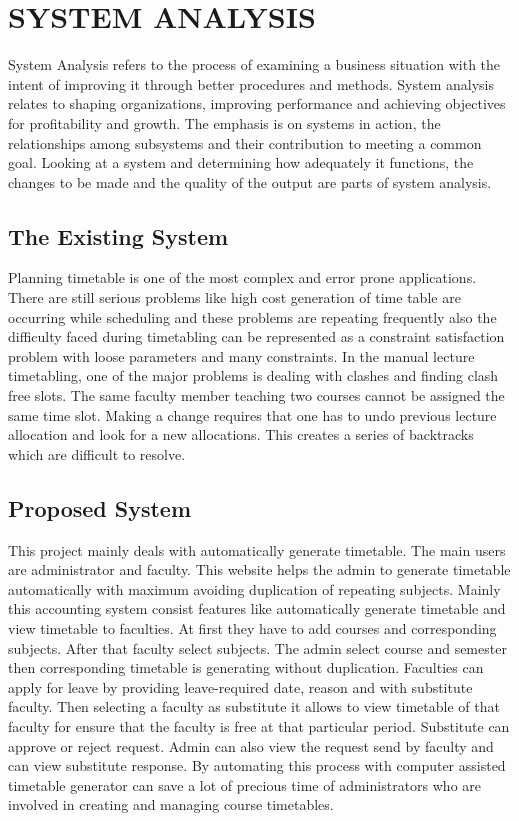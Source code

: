 %
%
%
%
\chapter{SYSTEM ANALYSIS}

             System Analysis refers to the process of examining a business situation with the intent of improving it through better procedures and methods. System analysis relates to shaping organizations, improving performance and achieving objectives for profitability and growth. The emphasis is on systems in action, the relationships among subsystems and their contribution to meeting a common goal. Looking at a system and determining how adequately it functions, the changes to be made and the quality of the output are parts of system analysis. 
%
\section{The Existing System}	

Planning timetable is one of the most complex and error prone applications. There are still serious problems like high cost generation of time table are occurring while scheduling and these problems are repeating frequently also the difficulty faced during timetabling can be represented as a constraint satisfaction problem with loose parameters and many constraints. In the manual lecture timetabling, one of the major problems is dealing with clashes and finding clash free slots. The same faculty member teaching two courses cannot be assigned the same time slot. Making a change requires that one has to undo previous lecture allocation and look for a new allocations. This creates a series of backtracks which are difficult to resolve.
\section{Proposed System}

This project mainly deals with automatically generate timetable. The main users are administrator and faculty. This website helps the admin to generate timetable automatically with maximum avoiding duplication of repeating subjects. Mainly this accounting system consist features like automatically generate timetable and view timetable to faculties. At first they have to add courses and corresponding subjects. After that faculty select subjects. The admin select course and semester then corresponding timetable is generating without duplication. Faculties can apply for leave by providing leave-required date, reason and with substitute faculty. Then selecting a faculty as substitute it allows to view timetable of that faculty for ensure that the faculty is free at that particular period. Substitute can approve or reject request. Admin can also view the request send by faculty and can view substitute response. By automating this process with computer assisted timetable generator can save a lot of precious time of administrators who are involved in creating and managing course timetables.
%
%
%
%
